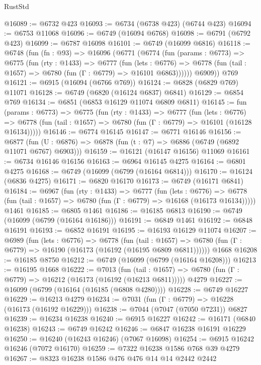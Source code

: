 \begin{lexlean}{RustStd}
\begin{coremodule}
@16089 := @6732 @423
@16093 := @6734 (@6738 @423) (@6744 @423)
@16094 := @6753 @11068
@16096 := @6749 (@16094 @6768)
@16098 := @6791 (@6792 @423)
@16099 := @6787 @16098
@16101 := @6749 (@16099 @6816)
@16118 := @6748
    (fun (fn : @93) =>
    @16096
      (@6771
        (@6774
          (fun (params : @6773) =>
          @6775
            (fun (rty : @1433) =>
            @6777
              (fun (lets : @6776) =>
              @6778 (fun (tail : @1657) => @6780 (fun (Γ : @6779) => @16101 @6863))))))
        @6909))
    @769
@16121 := @6915 (@16094 (@6766 @769))
@16124 := @6828 (@6829 @769) @11071
@16128 := @6749 (@6820 (@16124 @6837) @6841)
@16129 := @6854 @769
@16134 := @6851 (@6853 @16129 @11074 @6809 @6811)
@16145 := fun (params : @6773) =>
  @6775
    (fun (rty : @1433) =>
    @6777
      (fun (lets : @6776) =>
      @6778 (fun (tail : @1657) => @6780 (fun (Γ : @6779) => @16101 (@16128 @16134)))))
@16146 := @6774 @16145
@16147 := @6771 @16146
@16156 := @6877
    (fun (U : @6876) => @6878 (fun (t : @7) => @6886 (@6749 (@6892 @11071 @6767) @6903)))
@16159 := @16121 (@16147 @16156) @11069
@16161 := @6734 @16146 @16156
@16163 := @6964 @16145 @4275
@16164 := @6801 @4275
@16168 := @6749 (@16099 (@6799 (@16164 @6814)))
@16170 := @16124 (@6836 @4275)
@16171 := @6820 @16170
@16173 := @6749 (@16171 @6841)
@16184 := @6967
    (fun (rty : @1433) =>
    @6777
      (fun (lets : @6776) =>
      @6778 (fun (tail : @1657) => @6780 (fun (Γ : @6779) => @16168 (@16173 @16134)))))
    @1461
@16185 := @6805 @1461
@16186 := @16185 @6813
@16190 := @6749 (@16099 (@6799 (@16164 @16186)))
@16191 := @6849 @1461
@16192 := @6848 @16191
@16193 := @6852 @16191
@16195 := @16193 @16129 @11074
@16207 := @6989
    (fun (lets : @6776) =>
    @6778
      (fun (tail : @1657) =>
      @6780 (fun (Γ : @6779) => @16190 (@16173 (@16192 (@16195 @6809 @6811))))))
    @1668
@16208 := @16185 @8750
@16212 := @6749 (@16099 (@6799 (@16164 @16208)))
@16213 := @16195 @1668
@16222 := @7013
    (fun (tail : @1657) => @6780 (fun (Γ : @6779) => @16212 (@16173 (@16192 (@16213 @6811)))))
    @4279
@16227 := @16099 (@6799 (@16164 (@16185 (@6808 @4280))))
@16228 := @6749 @16227
@16229 := @16213 @4279
@16234 := @7031 (fun (Γ : @6779) => @16228 (@16173 (@16192 @16229)))
@16238 := @7044 (@7047 (@7050 @7231)) @6827
@16239 := @16234 @16238
@16240 := @6915 @16227
@16242 := @16171 (@6840 @16238)
@16243 := @6749 @16242
@16246 := @6847 @16238 @16191 @16229
@16250 := @16240 (@16243 @16246) (@7067 @16098)
@16254 := @6915 @16242 @16246 (@7072 @16170)
@16259 := @7322 @16238 @1586 @768 @39 @4279
@16267 := @8323 @16238 @1586 @476 @476 @14 @14 @2442 @2442

\end{coremodule}
\end{lexlean}
